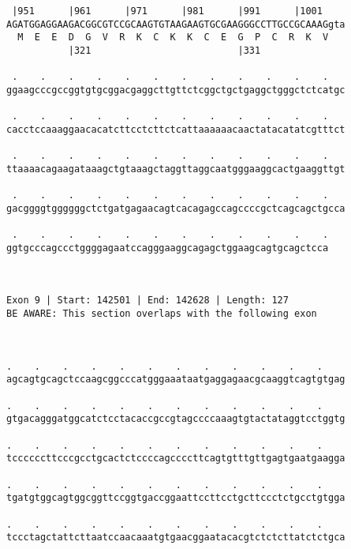 \documentclass{article}
\begin{document}
\begin{Verbatim}
 |951      |961      |971      |981      |991      |1001    
AGATGGAGGAAGACGGCGTCCGCAAGTGTAAGAAGTGCGAAGGGCCTTGCCGCAAAGgta
  M  E  E  D  G  V  R  K  C  K  K  C  E  G  P  C  R  K  V   
           |321                          |331               
  
 .    .    .    .    .    .    .    .    .    .    .    .   
ggaagcccgccggtgtgcggacgaggcttgttctcggctgctgaggctgggctctcatgc
                                                            
 .    .    .    .    .    .    .    .    .    .    .    .   
cacctccaaaggaacacatcttcctcttctcattaaaaaacaactatacatatcgtttct
                                                            
 .    .    .    .    .    .    .    .    .    .    .    .   
ttaaaacagaagataaagctgtaaagctaggttaggcaatgggaaggcactgaaggttgt
                                                            
 .    .    .    .    .    .    .    .    .    .    .    .   
gacggggtggggggctctgatgagaacagtcacagagccagccccgctcagcagctgcca
                                                            
 .    .    .    .    .    .    .    .    .    .    .    .
ggtgcccagccctggggagaatccagggaaggcagagctggaagcagtgcagctcca
                                                         
                                                         
 
Exon 9 | Start: 142501 | End: 142628 | Length: 127
BE AWARE: This section overlaps with the following exon



.    .    .    .    .    .    .    .    .    .    .    .    
agcagtgcagctccaagcggcccatgggaaataatgaggagaacgcaaggtcagtgtgag
                                                            
.    .    .    .    .    .    .    .    .    .    .    .    
gtgacagggatggcatctcctacaccgccgtagccccaaagtgtactataggtcctggtg
                                                            
.    .    .    .    .    .    .    .    .    .    .    .    
tccccccttcccgcctgcactctccccagccccttcagtgtttgttgagtgaatgaagga
                                                            
.    .    .    .    .    .    .    .    .    .    .    .    
tgatgtggcagtggcggttccggtgaccggaattccttcctgcttccctctgcctgtgga
                                                            
.    .    .    .    .    .    .    .    .    .    .    .    
tccctagctattcttaatccaacaaatgtgaacggaatacacgtctctcttatctctgca
                                                            

\end{Verbatim}
\end{document}
